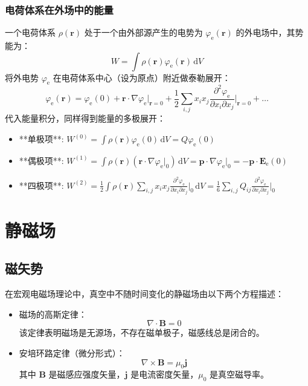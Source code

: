 \documentclass[fontset=none]{ctexart}
\begin{document}
\subsubsection{电荷体系在外场中的能量}
一个电荷体系 $\rho(\bm{r})$ 处于一个由外部源产生的电势为 $\varphi_{\mathrm{e}}(\bm{r})$ 的外电场中，其势能为：
\begin{equation}
    W = \int \rho(\bm{r}) \varphi_{\mathrm{e}}(\bm{r}) \, \mathrm{d}V
\end{equation}
将外电势 $\varphi_{\mathrm{e}}$ 在电荷体系中心（设为原点）附近做泰勒展开：
\begin{equation}
    \varphi_{\mathrm{e}}(\bm{r}) = \varphi_{\mathrm{e}}(0) + \bm{r} \cdot \nabla \varphi_{\mathrm{e}}\big|_{\bm{r}=0} + \frac{1}{2} \sum_{i,j} x_i x_j \frac{\partial^2 \varphi_{\mathrm{e}}}{\partial x_i \partial x_j}\bigg|_{\bm{r}=0} + \dots
\end{equation}
代入能量积分，同样得到能量的多极展开：
\begin{itemize}
    \item **单极项**: $W^{(0)} = \int \rho(\bm{r}) \varphi_{\mathrm{e}}(0) \, \mathrm{d}V = Q \varphi_{\mathrm{e}}(0)$
    \item **偶极项**: $W^{(1)} = \int \rho(\bm{r}) \left( \bm{r} \cdot \nabla \varphi_{\mathrm{e}}\big|_{0} \right) \, \mathrm{d}V = \bm{p} \cdot \nabla \varphi_{\mathrm{e}}\big|_{0} = -\bm{p} \cdot \bm{E}_{\mathrm{e}}(0)$
    \item **四极项**: $W^{(2)} = \frac{1}{2} \int \rho(\bm{r}) \sum_{i,j} x_i x_j \frac{\partial^2 \varphi_{\mathrm{e}}}{\partial x_i \partial x_j}\bigg|_{0} \, \mathrm{d}V = \frac{1}{6} \sum_{i,j} Q_{ij} \frac{\partial^2 \varphi_{\mathrm{e}}}{\partial x_i \partial x_j}\bigg|_{0}$
\end{itemize}

\section{静磁场}

\subsection{磁矢势}
\begin{definition}[静磁场基本方程]
在宏观电磁场理论中，真空中不随时间变化的静磁场由以下两个方程描述：
\begin{itemize}
    \item 磁场的高斯定律：
    \begin{equation}
        \nabla \cdot \bm{B} = 0
    \end{equation}
    该定律表明磁场是无源场，不存在磁单极子，磁感线总是闭合的。
    \item 安培环路定律（微分形式）：
    \begin{equation}
        \nabla \times \bm{B} = \mu_0 \bm{j}
    \end{equation}
    其中 $\bm{B}$ 是磁感应强度矢量，$\bm{j}$ 是电流密度矢量，$\mu_0$ 是真空磁导率。
\end{itemize}
\end{definition}
\end{document}
